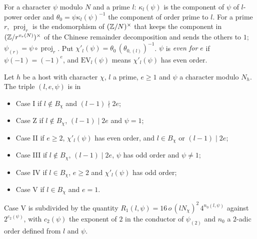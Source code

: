 \begin{definition}\label{sha:charparts}
For a character $\psi$ modulo $N$ and a prime $l$: $\kappa_l(\psi)$ is the component of
$\psi$ of $l$-power order and $\theta_0=\psi\kappa_l(\psi)^{-1}$ the component of order
prime to $l$. For a prime $r$, $\operatorname{proj}_r$ is the endomorphism of
$(\mathbb{Z}/N)^{\times}$ that keeps the component in $(\mathbb{Z}/r^{v_r(N)})^{\times}$ of the Chinese
remainder decomposition and sends the others to $1$; $\psi_{(r)}=\psi\circ\operatorname{proj}_r$.
Put $\chi'_l(\psi)=\theta_0\,(\theta_{0,(l)})^{-1}$. $\psi$ is \emph{even for $e$} if
$\psi(-1)=(-1)^e$, and $\mathrm{EV}_l(\psi)$ means $\chi'_l(\psi)$ has even order.
\end{definition}

\begin{definition}[cases]\label{sha:cases}
Let $h$ be a host with character $\chi$, $l$ a prime, $e\ge1$ and $\psi$ a character
modulo $N_h$. The triple $(l,e,\psi)$ is in
\begin{itemize}
\item Case I if $l\notin B_{\chi}$ and $(l-1)\nmid2e$;
\item Case Z if $l\notin B_{\chi}$, $(l-1)\mid2e$ and $\psi=1$;
\item Case II if $e\ge2$, $\chi'_l(\psi)$ has even order, and $l\in B_{\chi}$ or $(l-1)\mid2e$;
\item Case III if $l\notin B_{\chi}$, $(l-1)\mid 2e$, $\psi$ has odd order and $\psi\ne1$;
\item Case IV if $l\in B_{\chi}$, $e\ge2$ and $\chi'_l(\psi)$ has odd order;
\item Case V if $l\in B_{\chi}$ and $e=1$.
\end{itemize}
Case V is subdivided by the quantity $R_1(l,\psi)=16\,o\,(lN_{\chi})^2\,4^{n_0(l,\psi)}$
against $2^{c_2(\psi)}$, with $c_2(\psi)$ the exponent of $2$ in the conductor of
$\psi_{(2)}$ and $n_0$ a $2$-adic order defined from $l$ and $\psi$.
\end{definition}

